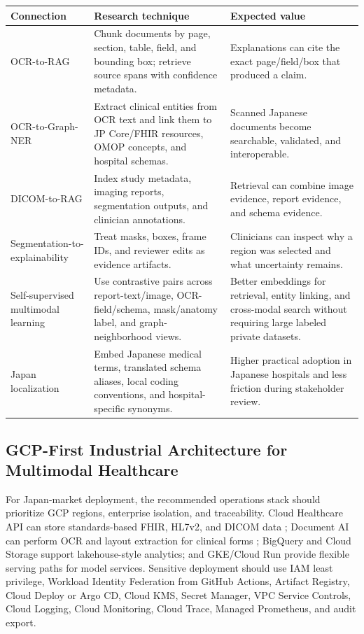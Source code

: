 \begin{longtable}{p{}p{}p{}}
\toprule
\textbf{Connection} & \textbf{Research technique} & \textbf{Expected value} \\
\midrule
OCR-to-RAG & Chunk documents by page, section, table, field, and bounding box; retrieve source spans with confidence metadata. & Explanations can cite the exact page/field/box that produced a claim. \\
\addlinespace
OCR-to-Graph-NER & Extract clinical entities from OCR text and link them to JP Core/FHIR resources, OMOP concepts, and hospital schemas. & Scanned Japanese documents become searchable, validated, and interoperable. \\
\addlinespace
DICOM-to-RAG & Index study metadata, imaging reports, segmentation outputs, and clinician annotations. & Retrieval can combine image evidence, report evidence, and schema evidence. \\
\addlinespace
Segmentation-to-explainability & Treat masks, boxes, frame IDs, and reviewer edits as evidence artifacts. & Clinicians can inspect why a region was selected and what uncertainty remains. \\
\addlinespace
Self-supervised multimodal learning & Use contrastive pairs across report-text/image, OCR-field/schema, mask/anatomy label, and graph-neighborhood views. & Better embeddings for retrieval, entity linking, and cross-modal search without requiring large labeled private datasets. \\
\addlinespace
Japan localization & Embed Japanese medical terms, translated schema aliases, local coding conventions, and hospital-specific synonyms. & Higher practical adoption in Japanese hospitals and less friction during stakeholder review. \\
\bottomrule
\end{longtable}

\subsection{GCP-First Industrial Architecture for Multimodal Healthcare}

For Japan-market deployment, the recommended operations stack should prioritize GCP regions, enterprise isolation, and traceability. Cloud Healthcare API can store standards-based FHIR, HL7v2, and DICOM data \cite{gcpHealthcare}; Document AI can perform OCR and layout extraction for clinical forms \cite{gcpDocumentAI}; BigQuery and Cloud Storage support lakehouse-style analytics; and GKE/Cloud Run provide flexible serving paths for model services. Sensitive deployment should use IAM least privilege, Workload Identity Federation from GitHub Actions, Artifact Registry, Cloud Deploy or Argo CD, Cloud KMS, Secret Manager, VPC Service Controls, Cloud Logging, Cloud Monitoring, Cloud Trace, Managed Prometheus, and audit export.

